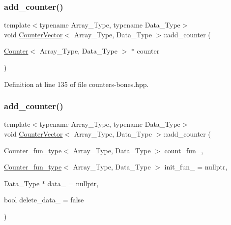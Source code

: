 \subsubsection{\texorpdfstring{add\+\_\+counter()}{add\_counter()}\hspace{0.1cm}{\footnotesize\ttfamily [2/3]}}
{\footnotesize\ttfamily template$<$typename Array\+\_\+\+Type, typename Data\+\_\+\+Type$>$ \\
void \hyperlink{class_counter_vector}{Counter\+Vector}$<$ Array\+\_\+\+Type, Data\+\_\+\+Type $>$\+::add\+\_\+counter (\begin{DoxyParamCaption}\item[{\hyperlink{class_counter}{Counter}$<$ Array\+\_\+\+Type, Data\+\_\+\+Type $>$ $\ast$}]{counter }\end{DoxyParamCaption})\hspace{0.3cm}{\ttfamily [inline]}}



Definition at line 135 of file counters-\/bones.\+hpp.

\mbox{\label{class_counter_vector_adb32ff1af45bc05a292a5cb064dc414d}} 
\subsubsection{\texorpdfstring{add\+\_\+counter()}{add\_counter()}\hspace{0.1cm}{\footnotesize\ttfamily [3/3]}}
{\footnotesize\ttfamily template$<$typename Array\+\_\+\+Type, typename Data\+\_\+\+Type$>$ \\
void \hyperlink{class_counter_vector}{Counter\+Vector}$<$ Array\+\_\+\+Type, Data\+\_\+\+Type $>$\+::add\+\_\+counter (\begin{DoxyParamCaption}\item[{\hyperlink{typedefs_8hpp_ac0160f52f564dea3ac033b374cffbfe7}{Counter\+\_\+fun\+\_\+type}$<$ Array\+\_\+\+Type, Data\+\_\+\+Type $>$}]{count\+\_\+fun\+\_\+,  }\item[{\hyperlink{typedefs_8hpp_ac0160f52f564dea3ac033b374cffbfe7}{Counter\+\_\+fun\+\_\+type}$<$ Array\+\_\+\+Type, Data\+\_\+\+Type $>$}]{init\+\_\+fun\+\_\+ = {\ttfamily nullptr},  }\item[{Data\+\_\+\+Type $\ast$}]{data\+\_\+ = {\ttfamily nullptr},  }\item[{bool}]{delete\+\_\+data\+\_\+ = {\ttfamily false} }\end{DoxyParamCaption})\hspace{0.3cm}{\ttfamily [inline]}}



